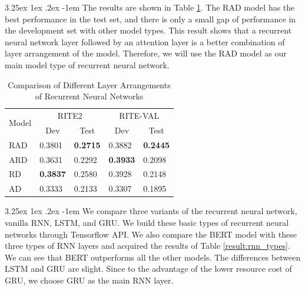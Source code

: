 \documentclass[12pt]{article}
\makeatletter
\renewcommand\paragraph{\@startsection{paragraph}{5}{\z@}%
  {3.25ex \@plus1ex \@minus.2ex}%
  {-1em}%
  {\normalfont\normalsize\bfseries}}
\makeatother
\begin{document}
\begin{CJK*}{UTF8}{bkai}
\begin{spacing}{1.77}
\paragraph{}
The results are shown in Table \ref{result:nn_types_comparison}. The RAD model has the best performance in the test set, and there is only a small gap of performance in the development set with other model types. This result shows that a recurrent neural network layer followed by an attention layer is a better combination of layer arrangement of the model. Therefore, we will use the RAD model as our main model type of recurrent neural network.
\begin{table}[H]
  \centering
  \setlength{\extrarowheight}{-3pt}
  \caption{Comparison of Different Layer Arrangements of Recurrent Neural Networks}
  \label{result:nn_types_comparison}
  \begin{tabular}{|l|l|l|l|l|}
  \hline
  \multicolumn{1}{|c|}{\multirow{2}{*}{Model}} & \multicolumn{2}{c|}{RITE2} & \multicolumn{2}{c|}{RITE-VAL} \\ \cline{2-5}
  \multicolumn{1}{|c|}{} & \multicolumn{1}{c|}{Dev} & \multicolumn{1}{c|}{Test} & \multicolumn{1}{c|}{Dev} & \multicolumn{1}{c|}{Test} \\ \hline
  RAD & 0.3801 & \textbf{0.2715} & 0.3882 & \textbf{0.2445} \\ \hline
  ARD & 0.3631 & 0.2292 & \textbf{0.3933} & 0.2098 \\ \hline
  RD & \textbf{0.3837} & 0.2580 & 0.3928 & 0.2148 \\ \hline
  AD & 0.3333 & 0.2133 & 0.3307 & 0.1895 \\ \hline
  \end{tabular}
\end{table}

\paragraph{}
We compare three variants of the recurrent neural network, vanilla RNN, LSTM, and GRU. We build these basic types of recurrent neural networks through Tensorflow API. We also compare the BERT model with these three types of RNN layers and acquired the results of Table \ref{result:rnn_types}. We can see that BERT outperforms all the other models. The differences between LSTM and GRU are slight. Since to the advantage of the lower resource cost of GRU, we choose GRU as the main RNN layer.


\end{spacing}
\end{CJK*}
\end{document}
